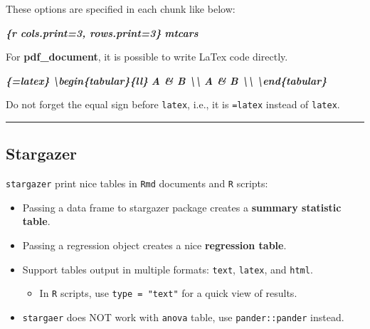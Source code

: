 \documentclass[
  a4paper,
  twoside,
  openright]{book}
\newenvironment{Shaded}{\begin{snugshade}}{\end{snugshade}}
\newcommand{\InformationTok}[1]{\textcolor[rgb]{0.56,0.35,0.01}{\textbf{\textit{#1}}}}
\providecommand{\tightlist}{%
  \setlength{\itemsep}{0pt}\setlength{\parskip}{0pt}}
\theoremstyle{definition}
\theoremstyle{definition}
\theoremstyle{definition}
\theoremstyle{definition}
\theoremstyle{remark}
\begin{document}
These options are specified in each chunk like below:

\begin{Shaded}
\begin{Highlighting}[]
\InformationTok{\textasciigrave{}\textasciigrave{}\textasciigrave{}\{r cols.print=3, rows.print=3\}}
\InformationTok{mtcars}
\InformationTok{\textasciigrave{}\textasciigrave{}\textasciigrave{}}
\end{Highlighting}
\end{Shaded}

For \textbf{pdf\_document}, it is possible to write LaTex code directly.

\begin{Shaded}
\begin{Highlighting}[]
\InformationTok{\textasciigrave{}\textasciigrave{}\textasciigrave{}\{=latex\}}
\InformationTok{\textbackslash{}begin\{tabular\}\{ll\}}
\InformationTok{A \& B \textbackslash{}\textbackslash{}}
\InformationTok{A \& B \textbackslash{}\textbackslash{}}
\InformationTok{\textbackslash{}end\{tabular\}}
\InformationTok{\textasciigrave{}\textasciigrave{}\textasciigrave{}}
\end{Highlighting}
\end{Shaded}

Do not forget the equal sign before \texttt{latex}, i.e., it is \texttt{=latex} instead of \texttt{latex}.

\begin{center}\rule{0.5\linewidth}{0.5pt}\end{center}

\subsection{Stargazer}\label{stargazer}

\texttt{stargazer} print nice tables in \texttt{Rmd} documents and \texttt{R} scripts:

\begin{itemize}
\item
  Passing a data frame to stargazer package creates a {\textbf{summary statistic table}}.
\item
  Passing a regression object creates a nice {\textbf{regression table}}.
\item
  Support tables output in multiple formats: \texttt{text}, \texttt{latex}, and \texttt{html}.

  \begin{itemize}
  \tightlist
  \item
    In \texttt{R} scripts, use \texttt{type\ =\ "text"} for a quick view of results.
  \end{itemize}
\item
  \texttt{stargaer} does NOT work with \texttt{anova} table, use \texttt{pander::pander} instead.
\end{itemize}
\end{document}
